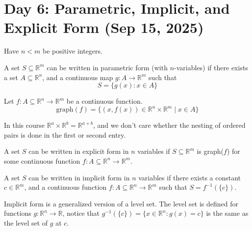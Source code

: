 \section{Day 6: Parametric, Implicit, and Explicit Form (Sep 15, 2025)}
Have $n < m$ be positive integers. 
\begin{definition}
    A set $S \subseteq \mathbb{R}^m$ can be written in parametric form (with $n$-variables) if there exists a set $A \subseteq \mathbb{R}^n$, and a continuous map $g : A \to \mathbb{R}^m$ such that 
    \[
    S = \{ g(x) : x \in A \}
    \]
\end{definition}

\begin{definition}
Let $f : A \subseteq \mathbb{R}^n \to \mathbb{R}^m$ be a continuous function. 
\[
    \text{graph}(f) = \{ (x, f(x)) \in \mathbb{R}^n \times \mathbb{R}^m \mid x \in A \}
\]
\end{definition}

In this course $\mathbb{R}^a \times \mathbb{R}^b = \mathbb{R}^{a + b}$, and we don't care whether the nesting of ordered pairs is done in the first or second entry.

\begin{definition}
    A set $S$ can be written in explicit form in $n$ variables if $S \subseteq \mathbb{R}^m$ is graph($f$) for some continuous function $f: A \subseteq \mathbb{R}^n \to \mathbb{R}^m$.
\end{definition}

\begin{definition}
    A set $S$ can be written in implicit form in $n$ variables if there exists a constant $c \in \mathbb{R}^m$, and a continuous function $f : A \subseteq \mathbb{R}^n \to \mathbb{R}^m$ such that $S = f^{-1}(\{ c \})$.
\end{definition}

Implicit form is a generalized version of a level set. The level set is defined for functions $g : \mathbb{R}^n \to \mathbb{R}$, notice that $g^{-1}(\{ c \}) = \{ x \in \mathbb{R}^n : g(x) = c \}$ is the same as the level set of $g$ at $c$.

